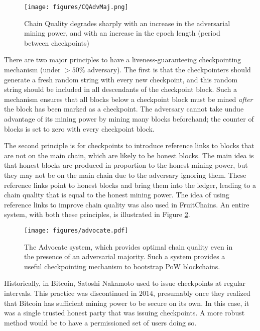 \documentclass{article}
\begin{document}
\begin{figure}
    \centering
    \texttt{[image: figures/CQAdvMaj.png]}
    \caption{Chain Quality degrades sharply with an increase in the adversarial mining power, and with an increase in the epoch length (period between checkpoints)}
    \label{fig:CQAdvMaj}
\end{figure}

There are two major principles to have a liveness-guaranteeing checkpointing mechanism (under $> 50\%$ adversary). The first is that the checkpointers should generate a fresh random string with every new checkpoint, and this random string should be included in all descendants of the checkpoint block. Such a mechanism ensures that all blocks below a checkpoint block must be mined \textit{after} the block has been marked as a checkpoint. The adversary cannot take undue advantage of its mining power by mining many blocks beforehand; the counter of blocks is set to zero with every checkpoint block. 

The second principle is for checkpoints to introduce reference links to blocks that are not on the main chain, which are likely to be honest blocks. The main idea is that honest blocks are produced in proportion to the honest mining power, but they may not be on the main chain due to the adversary ignoring them. These reference links point to honest blocks and bring them into the ledger, leading to a chain quality that is equal to the honest mining power. The idea of using reference links to improve chain quality was also used in FruitChains. An entire system, with both these principles, is illustrated in Figure \ref{fig:advocate}.

\begin{figure}
    \centering
    \texttt{[image: figures/advocate.pdf]}
    \caption{The Advocate system, which provides optimal chain quality even in the presence of an adversarial majority. Such a system provides a useful checkpointing mechanism to bootstrap PoW blockchains.}
    \label{fig:advocate}
\end{figure}

Historically, in Bitcoin, Satoshi Nakamoto used to issue checkpoints at regular intervals. This practice was discontinued in $2014$, presumably once they realized that Bitcoin has sufficient mining power to be secure on its own. In this case, it was a single trusted honest party that was issuing checkpoints. A more robust method would be to have a permissioned set of users doing so.
\end{document}
